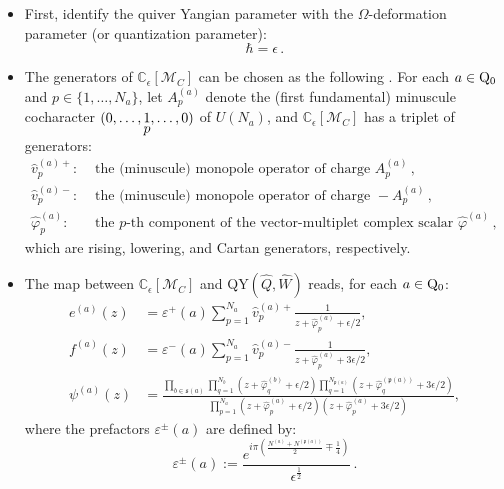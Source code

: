 \documentclass[12pt,a4paper]{article}
\newcommand{\eps}{\epsilon}
\begin{document}
\begin{itemize}
    \item First, identify  the quiver Yangian parameter with the $\Omega$-deformation parameter (or quantization parameter):
    \begin{equation}
        \hbar=\eps\,.
    \end{equation}
    \item The generators of $\mathbb C_\eps[\mathcal M_C]$ can be chosen as the following \cite{ChenLi2026, BullimoreEtAl2018}. For each $a\in\rm Q_0$ and $p\in \{1,\dots,N_a\}$, let $A^{(a)}_p$ denote the (first fundamental) minuscule cocharacter $(0,\dots, \stackunder{$1$}{$p$},\dots,0)$ of $U(N_a)$, and $\mathbb C_\eps[\mathcal M_C]$ has a triplet of generators:
    \begin{equation}
        \begin{aligned}
            \hat{v}^{(a)+}_p:&\text{ the (minuscule) monopole operator of charge } A^{(a)}_p 
            \,,\\
            \hat{v}^{(a)-}_p:&\text{ the (minuscule) monopole operator of charge } -A^{(a)}_p 
            \,,\\
            \hat{\varphi}^{(a)}_p:& \text{ the $p$-th component of the vector-multiplet complex scalar $\hat\varphi^{(a)}$}
            \,,
        \end{aligned}
        \label{eq:CBA_generators}
    \end{equation}
    which are rising, lowering, and Cartan generators, respectively.
    \item The map between $\mathbb C_\eps[\mathcal M_C]$ and QY$(\hat Q,\hat W)$ reads, for each $a\in \rm Q_0$:
    {\small
    \begin{align}
 e^{(a)}(z)
 &=\varepsilon^+(a)\sum_{p=1}^{N_a}
 \hat v_p^{(a)+}\frac{1}{z+\hat\varphi_p^{(a)}+\epsilon/2},
 \label{eq:chen-li-current-e}\\
 f^{(a)}(z)
 &=\varepsilon^-(a)\sum_{p=1}^{N_a}
 \hat v_p^{(a)-}\frac{1}{z+\hat\varphi_p^{(a)}+3\epsilon/2},
 \label{eq:chen-li-current-f}\\
 \psi^{(a)}(z)
 &=\frac{\displaystyle\prod_{b\in \mathfrak{s}(a)}\prod_{q=1}^{N_b}
 (z+\hat\varphi_q^{(b)}+\epsilon/2)
 \prod_{q=1}^{N_{\mathfrak{p}(a)}}
 (z+\hat\varphi_q^{(\mathfrak{p}(a))}+3\epsilon/2)}{\displaystyle\prod_{p=1}^{N_a}
 (z+\hat\varphi_p^{(a)}+\epsilon/2)
 (z+\hat\varphi_p^{(a)}+3\epsilon/2)},
 \label{eq:chen-li-current-psi}
\end{align}}
where the prefactors $\varepsilon^\pm(a)$ are defined by:
\begin{equation}\label{eq:epsilon+-}
\varepsilon^\pm(a):=\frac{e^{i\pi(\frac{N^{(a)}+N^{(\mathfrak{p}(a))}}{2}\mp\frac{1}{4})}}{\epsilon^{\frac{1}{2}}}\,.
\end{equation}
\end{itemize}
\end{document}
